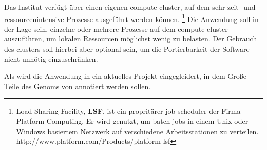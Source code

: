 Das Institut verfügt über einen eigenen compute cluster, auf dem sehr zeit- und
ressourcenintensive Prozesse ausgeführt werden können.
\footnote{Load Sharing Facility, \textbf{LSF}, ist ein propritärer job scheduler
der Firma Platform Computing.
Er wird genutzt, um batch jobs in einem Unix oder
Windows basiertem Netzwerk auf verschiedene Arbeitsstationen zu
verteilen.
\citep{ault_oracle_2004} {http://www.platform.com/Products/platform-lsf}}
Die Anwendung soll in der Lage sein, einzelne oder mehrere Prozesse auf dem
compute cluster auszuführen, um lokalen Ressourcen möglichst wenig zu
belasten. Der Gebrauch des clusters soll hierbei aber optional sein, um die
Portierbarkeit der Software nicht unnötig einzuschränken. 

Als  wird die Anwendung in ein aktuelles Projekt
eingegleidert, in dem Große Teile des Genoms von  annotiert werden sollen. 

